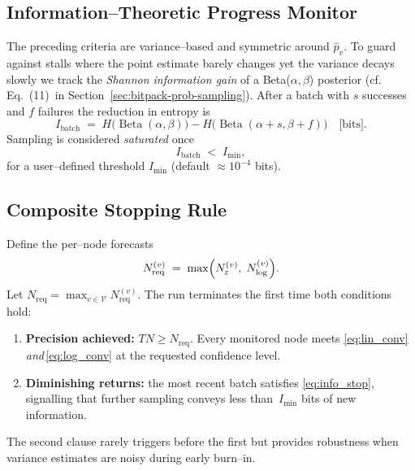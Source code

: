 \subsection{Information--Theoretic Progress Monitor}
\label{subsec:info_gain}

The preceding criteria are variance--based and symmetric around
$\widehat{p}_v$.  To guard against stalls where the point estimate barely
changes yet the variance decays slowly we track the \emph{Shannon information
gain} of a Beta($\alpha,\beta$) posterior (cf.
Eq.~(11)~in Section~\ref{sec:bitpack-prob-sampling}).  After a batch with
$s$ successes and $f$ failures the reduction in entropy is
\begin{equation}
  I_{\text{batch}}
  \;=\;
  H\bigl(\operatorname{Beta}(\alpha,\beta)\bigr)
  - H\bigl(\operatorname{Beta}(\alpha+s,\beta+f)\bigr)
  \quad\text{[bits]}.
  \label{eq:info_gain}
\end{equation}
Sampling is considered \emph{saturated} once
\begin{equation}
  I_{\text{batch}} \;<\; I_{\min},
  \label{eq:info_stop}
\end{equation}
for a user--defined threshold $I_{\min}$ (default $\approx 10^{-4}$ bits).

\subsection{Composite Stopping Rule}
\label{subsec:composite_rule}

Define the per--node forecasts
\begin{equation}
  N^{(v)}_{\text{req}} \;=\; \max\Bigl(N_{\varepsilon}^{(v)},\;N^{(v)}_{\log}\Bigr).
  \label{eq:n_req_node}
\end{equation}
Let $N_{\text{req}}=\max_{v\in\mathcal{V}}N^{(v)}_{\text{req}}$.  The run
terminates the first time both conditions hold:
\begin{enumerate}
  \item \textbf{Precision achieved:} $T N \ge N_{\text{req}}$.  Every monitored
        node meets \eqref{eq:lin_conv} \emph{and}\,\eqref{eq:log_conv} at the
        requested confidence level.
  \item \textbf{Diminishing returns:} the most recent batch satisfies
        \eqref{eq:info_stop}, signalling that further sampling conveys less
        than~$I_{\min}$ bits of new information.
\end{enumerate}
The second clause rarely triggers before the first but provides robustness
when variance estimates are noisy during early burn--in.

